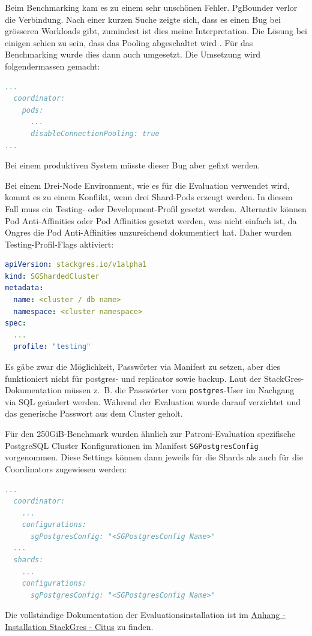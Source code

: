 \begin{flushleft}
    Beim Benchmarking kam es zu einem sehr unschönen Fehler.
    PgBounder verlor die Verbindung.
    Nach einer kurzen Suche zeigte sich, dass es einen Bug bei grösseren Workloads gibt, zumindest ist dies meine Interpretation.
    Die Lösung bei einigen schien zu sein, dass das Pooling abgeschaltet wird  \cite{JU2PRK9L}.
    Für das Benchmarking wurde dies dann auch umgesetzt.
    Die Umsetzung wird folgendermassen gemacht:
\lstset{style=gra_codestyle}
\begin{lstlisting}[language=yaml, caption=StackGres-Citus - StorageClass -PVC Binding,captionpos=b,label={lst:stackgres-citus-disable-pooler},breaklines=true]
...
  coordinator:
    pods:
      ...
      disableConnectionPooling: true
...
\end{lstlisting}
    Bei einem produktiven System müsste dieser Bug aber gefixt werden.
\end{flushleft}
\begin{flushleft}
    Bei einem Drei-Node Environment, wie es für die Evaluation verwendet wird, kommt es zu einem Konflikt, wenn drei Shard-Pods erzeugt werden.
    In diesem Fall muss ein Testing- oder Development-Profil gesetzt werden.
    Alternativ können Pod Anti-Affinities oder Pod Affinities gesetzt werden, was nicht einfach ist, da Ongres die Pod Anti-Affinities unzureichend dokumentiert hat.
    Daher wurden Testing-Profil-Flags aktiviert:
\lstset{style=gra_codestyle}
\begin{lstlisting}[language=yaml, caption=StackGres-Citus - Cluster Profil,captionpos=b,label={lst:stackgres-citus-cluster-profile},breaklines=true]
apiVersion: stackgres.io/v1alpha1
kind: SGShardedCluster
metadata:
  name: <cluster / db name>
  namespace: <cluster namespace>
spec:
  ...
  profile: "testing"
\end{lstlisting}
\end{flushleft}
\begin{flushleft}
    Es gäbe zwar die Möglichkeit, Passwörter via Manifest zu setzen, aber dies funktioniert nicht für postgres- und replicator sowie backup.
    Laut der StackGres-Dokumentation müssen z. B. die Passwörter vom \texttt{postgres}-User im Nachgang via SQL geändert werden.
    Während der Evaluation wurde darauf verzichtet und das generische Passwort aus dem Cluster geholt.
\end{flushleft}
\begin{flushleft}
    Für den 250GiB-Benchmark wurden ähnlich zur Patroni-Evaluation spezifische \Gls{PostgreSQL Cluster} Konfigurationen im Manifest \texttt{SGPostgresConfig} vorgenommen.
    Diese Settings können dann jeweils für die Shards als auch für die Coordinators zugewiesen werden:
    \lstset{style=gra_codestyle}
    \begin{lstlisting}[language=yaml, caption=StackGres-Citus - SGPostgresConfig,captionpos=b,label={lst:stackgres-citus-SGPostgresConfig-profile},breaklines=true]
  ...
  coordinator:
    ...
    configurations:
      sgPostgresConfig: "<SGPostgresConfig Name>"
  ...
  shards:
    ...
    configurations:
      sgPostgresConfig: "<SGPostgresConfig Name>"
    \end{lstlisting}
\end{flushleft}
\begin{flushleft}
    Die vollständige Dokumentation der Evaluationsinstallation ist im \hyperref[subsec:evaluation_installation_stackgres]{Anhang - Installation StackGres - Citus} zu finden.
\end{flushleft}